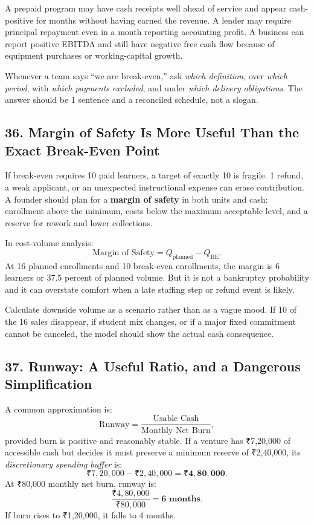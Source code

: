 A prepaid program may have cash receipts well ahead of service and appear cash-positive for months without having earned the revenue. A lender may require principal repayment even in a month reporting accounting profit. A business can report positive EBITDA and still have negative free cash flow because of equipment purchases or working-capital growth.

Whenever a team says ``we are break-even,'' ask \emph{which definition}, over \emph{which period}, with \emph{which payments excluded}, and under \emph{which delivery obligations}. The answer should be 1 sentence and a reconciled schedule, not a slogan.

\subsection*{36. Margin of Safety Is More Useful Than the Exact Break-Even Point}

If break-even requires 10 paid learners, a target of exactly 10 is fragile. 1 refund, a weak applicant, or an unexpected instructional expense can erase contribution. A founder should plan for a \textbf{margin of safety} in both units and cash: enrollment above the minimum, costs below the maximum acceptable level, and a reserve for rework and lower collections.

In cost-volume analysis:
\begin{equation}
\text{Margin of Safety} = Q_{\text{planned}} - Q_{\text{BE}}.
\end{equation}
At 16 planned enrollments and 10 break-even enrollments, the margin is 6 learners or 37.5 percent of planned volume. But it is not a bankruptcy probability and it can overstate comfort when a late staffing step or refund event is likely.

Calculate downside volume as a scenario rather than as a vague mood. If 10 of the 16 sales disappear, if student mix changes, or if a major fixed commitment cannot be canceled, the model should show the actual cash consequence.

\subsection*{37. Runway: A Useful Ratio, and a Dangerous Simplification}

A common approximation is:
\begin{equation}
\text{Runway} = \frac{\text{Usable Cash}}{\text{Monthly Net Burn}},
\end{equation}
provided burn is positive and reasonably stable. If a venture has ₹7,20,000 of accessible cash but decides it must preserve a minimum reserve of ₹2,40,000, its \emph{discretionary spending buffer} is:
\begin{equation}
₹7,20,000 - ₹2,40,000 = \mathbf{₹4,80,000}.
\end{equation}
At ₹80,000 monthly net burn, runway is:
\begin{equation}
\frac{₹4,80,000}{₹80,000} = \mathbf{6\text{ months}}.
\end{equation}
If burn rises to ₹1,20,000, it falls to 4 months.

